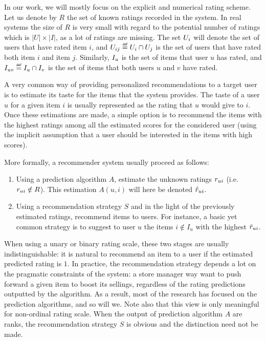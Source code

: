 In our work, we will mostly focus on the explicit and numerical rating scheme.
Let us denote by $R$ the set of known ratings recorded in the system. In real
systems the size of $R$ is very small with regard to the potential number of
ratings which is $|U| \times |I|$, as a lot of ratings are missing. The set
$U_i$ will denote the set of users that have rated item $i$, and $\Uij \eqdef
U_i \cap U_j$ is the set of users that have rated both item $i$ and item $j$.
Similarly, $I_u$ is the set of items that user $u$ has rated, and $\Iuv \eqdef
I_u \cap I_v$ is the set of items that both users $u$ and $v$ have rated.

A very common way of providing personalized recommendations to a target user is
to estimate its taste for the items that the system provides. The taste of a
user $u$ for a given item $i$ is usually represented as the rating that $u$
would give to $i$.  Once these estimations are made, a simple option is to
recommend the items with the highest ratings among all the estimated scores for
the considered user (using the implicit assumption that a user should be
interested in the items with high scores).

More formally, a recommender system usually proceed as follows:
\begin{enumerate}
\item Using a prediction algorithm $A$, estimate the unknown ratings $r_{ui}$
  (i.e. $r_{ui} \notin R$). This estimation $A(u, i)$ will here be denoted
    $\hat{r}_{ui}$.
\item Using a recommendation strategy $S$ and in the light of the previously
  estimated ratings, recommend items to users. For instance, a basic yet common
    strategy is to suggest to user $u$ the items $i \notin I_u$ with the
    highest $\hat{r}_{ui}$.
\end{enumerate}

When using a unary or binary rating scale, these two stages are usually
indistinguishable: it is natural to recommend an item to a user if the
estimated predicted rating is $1$. In practice, the recommendation strategy
depends a lot on the pragmatic constraints of the system: a store manager way
want to push forward a given item to boost its sellings, regardless of the
rating predictions outputted by the algorithm. As a result, most of the
research has focused on the prediction algorithms, and so will we. Note also
that this view is only meaningful for non-ordinal rating scale. When the output
of prediction algorithm $A$ are ranks, the recommendation strategy $S$ is
obvious and the distinction need not be made.

